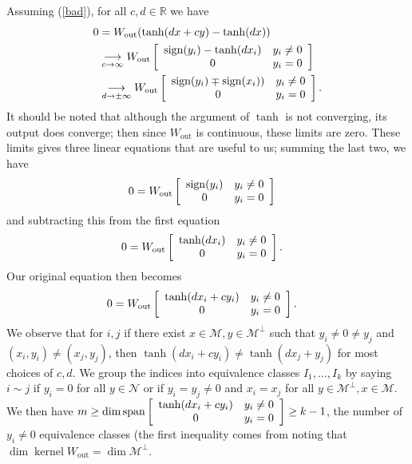 \documentclass[12pt,oneside]{article}
\theoremstyle{plain}
\newcommand{\mat}[2]{
    \IfInteger{#1}{
        \left[\begin{array}{*{#1}c} #2 \end{array}\right]
    }{
        \left[\begin{array}{#1} #2 \end{array}\right]}
    }
\newcommand{\Wout}{W_{\text{out}}}
\begin{document}
Assuming (\ref{bad}), for all $c, d\in\mathbb{R}$ we have
\begin{align*}
    0 &= \Wout ( \tanh(dx + cy) - \tanh(dx))
    \\
    &\underset{c\rightarrow\infty}{\longrightarrow} \Wout\mat{2}{\operatorname{sign}(y_i) - \tanh(dx_i) & y_i\neq 0 \\
    0 & y_i=0}
    \\
    &\underset{d\rightarrow\pm\infty}{\longrightarrow} \Wout\mat{2}{\operatorname{sign}(y_i) \mp \operatorname{sign}(x_i)) & y_i\neq 0 \\
    0 & y_i=0}.
\end{align*}
It should be noted that although the argument of $\tanh$ is not converging, its output does converge; then since $\Wout$ is continuous, these limits are zero. These limits gives three linear equations that are useful to us; summing the last two, we have
\begin{align*}
    0 &= \Wout\mat{2}{\operatorname{sign}(y_i) & y_i\neq 0 \\
    0 & y_i=0}
\end{align*}
and subtracting this from the first equation
\begin{align*}
    0 &= \Wout\mat{2}{\tanh(dx_i) & y_i\neq 0 \\
    0 & y_i=0}.
\end{align*}
Our original equation then becomes
\begin{align*}
    0 &= \Wout\mat{2}{\tanh(dx_i + cy_i) & y_i\neq 0 \\
    0 & y_i=0}.
\end{align*}
We observe that for $i, j$ if there exist $x\in\mathcal{M}, y\in\mathcal{M}^\perp$ such that $y_i\neq0\neq y_j$ and $(x_i, y_i)\neq(x_j,y_j)$, then $\tanh(dx_i + cy_i)\neq \tanh(dx_j + y_j)$ for most choices of $c,d$. We group the indices into equivalence classes $I_1, \ldots, I_k$ by saying $i\sim j$ if $y_i=0$ for all $y\in\mathcal{N}$ or if $y_i=y_j\neq 0$ and $x_i=x_j$ for all $y\in \mathcal{M}^\perp, x\in\mathcal{M}$. We then have $m\geq \dim \operatorname{span} \mat{2}{\tanh(dx_i + cy_i) & y_i\neq 0 \\
    0 & y_i=0} \geq k-1$, the number of $y_i\neq 0$ equivalence classes (the first inequality comes from noting that $\dim \operatorname{kernel} \Wout = \dim \mathcal{M}^\perp$.
\end{document}
